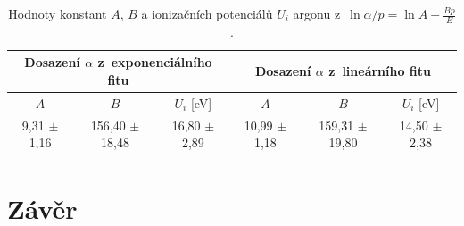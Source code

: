 \documentclass[a4paper,12pt]{article}
\begin{document}
\begin{center}
	\begin{table}[h]
		\centering
		\caption{Hodnoty konstant $A$, $B$ a ionizačních potenciálů $U_i$ 
		argonu z~$\ln \alpha/p = \ln A - \frac{Bp}{E}$.}
		\label{tab2}
		\begin{tabular}{|c|c|c|c|c|c|} \hline
			\multicolumn{3}{|c|}{Dosazení $\alpha$ z~exponenciálního fitu} & \multicolumn{3}{c|}{Dosazení $\alpha$ z~lineárního fitu}  \\ \hline
			$A$ & $B$ & $U_i$ [eV] & $A$ & $B$ & $U_i$ [eV] \\ \hline
			9,31 $\pm$ 1,16 & 156,40 $\pm$ 18,48 &  16,80 $\pm$ 2,89  & 10,99 $\pm$ 1,18 & 159,31 $\pm$ 19,80 & 14,50 $\pm$ 2,38\\ \hline

			
		\end{tabular}
	\end{table}
\end{center}

\newpage
\section{Závěr}
\end{document}
